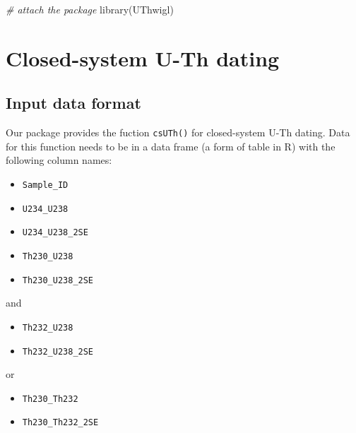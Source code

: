 \documentclass[]{elsarticle} %
\providecommand{\tightlist}{%
  \setlength{\itemsep}{0pt}\setlength{\parskip}{0pt}}
\newenvironment{Shaded}{\begin{snugshade}}{\end{snugshade}}
\newcommand{\CommentTok}[1]{\textcolor[rgb]{0.56,0.35,0.01}{\textit{#1}}}
\newcommand{\FunctionTok}[1]{\textcolor[rgb]{0.00,0.00,0.00}{#1}}
\newcommand{\NormalTok}[1]{#1}
\begin{document}
\begin{Shaded}
\begin{Highlighting}[]
\CommentTok{\# attach the package}
\FunctionTok{library}\NormalTok{(UThwigl)}
\end{Highlighting}
\end{Shaded}

\newpage

\hypertarget{closed-system-u-th-dating}{%
\section{Closed-system U-Th dating}\label{closed-system-u-th-dating}}

\hypertarget{input-data-format}{%
\subsection{Input data format}\label{input-data-format}}

Our package provides the fuction \texttt{csUTh()} for closed-system U-Th dating. Data for this function needs to be in a data frame (a form of table in R) with the following column names:

\begin{itemize}
\tightlist
\item
  \texttt{Sample\_ID}
\item
  \texttt{U234\_U238}
\item
  \texttt{U234\_U238\_2SE}
\item
  \texttt{Th230\_U238}
\item
  \texttt{Th230\_U238\_2SE}
\end{itemize}

and

\begin{itemize}
\tightlist
\item
  \texttt{Th232\_U238}
\item
  \texttt{Th232\_U238\_2SE}
\end{itemize}

or

\begin{itemize}
\tightlist
\item
  \texttt{Th230\_Th232}
\item
  \texttt{Th230\_Th232\_2SE}
\end{itemize}
\end{document}
